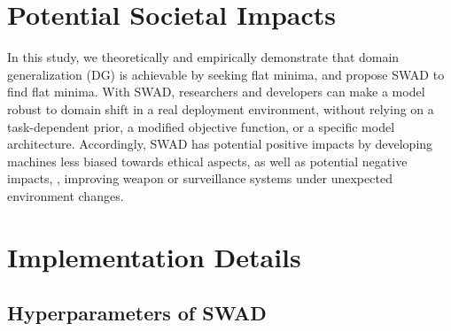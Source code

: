 
\section{Potential Societal Impacts} 
In this study, we theoretically and empirically demonstrate that domain generalization (DG) is achievable by seeking flat minima, and propose SWAD to find flat minima.
With SWAD, researchers and developers can make a model robust to domain shift in a real deployment environment, without relying on a task-dependent prior, a modified objective function, or a specific model architecture.
Accordingly, SWAD has potential positive impacts by developing machines less biased towards ethical aspects, as well as potential negative impacts, \eg, improving weapon or surveillance systems under unexpected environment changes.


\section{Implementation Details}

\subsection{Hyperparameters of SWAD}

